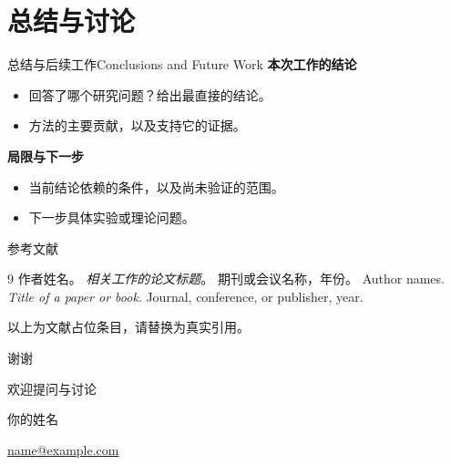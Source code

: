 \documentclass[aspectratio=169,11pt]{beamer}
\makeatletter
\providecommand{\heiti}{\CJKfamily{zhhei}}
\newcommand{\Presenter}{你的姓名}
\newcommand{\ContactEmail}{name@example.com}
\newcommand{\highlight}[1]{{\color{Accent}\bfseries #1}}
\makeatother
\begin{document}
\section{总结与讨论}

\begin{frame}{总结与后续工作}{Conclusions and Future Work}
  \highlight{本次工作的结论}
  \vspace{0.12cm}
  \begin{itemize}
    \setlength{\itemsep}{0.17cm}
    \item 回答了哪个研究问题？给出最直接的结论。
    \item 方法的主要贡献，以及支持它的证据。
  \end{itemize}
  \vspace{0.33cm}
  \highlight{局限与下一步}
  \vspace{0.12cm}
  \begin{itemize}
    \setlength{\itemsep}{0.17cm}
    \item 当前结论依赖的条件，以及尚未验证的范围。
    \item 下一步具体实验或理论问题。
  \end{itemize}
\end{frame}

\begin{frame}{参考文献}
  \begin{thebibliography}{9}
      作者姓名。
      \newblock \emph{相关工作的论文标题}。
      \newblock 期刊或会议名称，年份。
      Author names.
      \newblock \emph{Title of a paper or book}.
      \newblock Journal, conference, or publisher, year.
  \end{thebibliography}
  \vspace{0.3cm}
  {\small\color{Muted}以上为文献占位条目，请替换为真实引用。}
\end{frame}

\begin{frame}[noframenumbering]
  \vfill
  {\color{Primary}\LARGE\mdseries\heiti 谢谢\par}
  \vspace{0.3cm}
  {\color{Accent}\large 欢迎提问与讨论\par}
  \vspace{0.55cm}
  {\color{Muted}\Presenter\par}
  \vspace{0.12cm}
  {\small\color{Muted}\href{mailto:\ContactEmail}{\ContactEmail}\par}
  \vfill
\end{frame}
\end{document}
